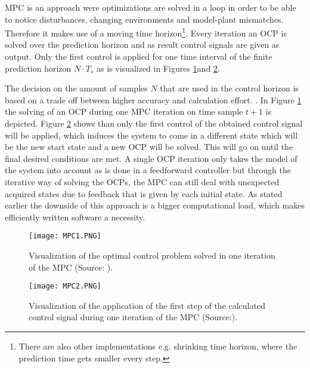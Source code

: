MPC is an approach were optimizations are solved in a loop in order to be able to notice disturbances, changing environments and model-plant mismatches. Therefore it makes use of a moving time horizon\footnote{There are also other implementations e.g. shrinking time horizon, where the prediction time gets smaller every step.}. Every iteration an OCP is solved over the prediction horizon and as result control signals are given as output. Only the first control is applied for one time interval of the finite prediction horizon $N\cdot T_{s}$ as is visualized in Figures \ref{fig:MPC1}and \ref{fig:MPC2}.

The decision on the amount of samples $N$ that are used in the control horizon is based on a trade off between higher accuracy and calculation effort. \cite{TongDuySon2019, Mercy2018}. In Figure \ref{fig:MPC1} the solving of an OCP during one MPC iteration on time sample $t+1$ is depicted. Figure \ref{fig:MPC2} shows than only the first control of the obtained control signal will be applied, which induces the system to come in a different state which will be the new start state and a new OCP will be solved. This will go on until the final desired conditions are met. A single OCP iteration only takes the model of the system into account as is done in a feedforward controller but through the iterative way of solving the OCPs, the MPC can still deal with unexpected acquired states due to feedback that is given by each initial state. As stated earlier the downside of this approach is a bigger computational load, which makes efficiently written software a necessity.  \cite{Patrinos2019}\\

\begin{figure}[h!]
	\centering
	\texttt{[image: MPC1.PNG]}
	\caption{Visualization of the optimal control problem solved in one iteration of the MPC (Source: \cite{Patrinos2019}).}
	\label{fig:MPC1}
\end{figure}

\begin{figure}[h!]
	\centering
	\texttt{[image: MPC2.PNG]}
	\caption{Visualization of the application of the first step of the calculated control signal during one iteration of the MPC (Source:\cite{Patrinos2019}).}
	\label{fig:MPC2}
\end{figure}






